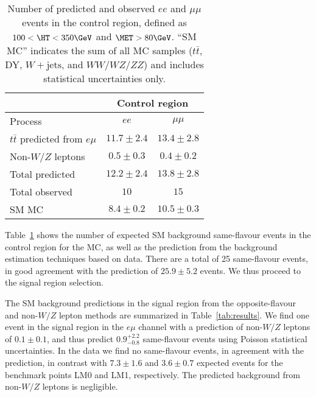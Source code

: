 \begin{table}[hbt]
\begin{center}
\caption{\label{tab:CRresults}
Number of predicted and observed $ee$ and $\mu\mu$ 
events in the control region, defined as $100 < \HT < 350\GeV$ and $\MET > 80\GeV$.
``SM MC'' indicates the sum of all MC samples ($t\bar{t}$, DY, $W+\textrm{jets}$, and $WW/WZ/ZZ$)
and includes statistical uncertainties only.
}
\vspace{2 mm}
\begin{tabular}{l|cc}
\hline
                                 & \multicolumn{2}{c}{Control region}               \\
\hline 
Process                          & $ee$          & $\mu\mu$        \\
\hline
$t\bar{t}$ predicted from $e\mu$ & $11.7\pm 2.4$ & $13.4\pm 2.8$   \\
Non-$W/Z$ leptons                & $0.5\pm 0.3$  & $0.4\pm0.2$ \\
\hline
Total predicted                  & $12.2\pm 2.4$ & $13.8 \pm 2.8$  \\
\hline\hline
Total observed                   & $10$          & $15$          \\
\hline \hline
SM MC                            & $8.4\pm 0.2$  & $10.5 \pm 0.3$    \\

\hline
\end{tabular}
\end{center}
\end{table}
 
Table~\ref{tab:CRresults} shows the number of expected SM background same-flavour events in the control region for the MC, 
as well as the prediction from the background estimation techniques based on data. There are a total of 25 same-flavour 
events, in good agreement with the prediction of $25.9 \pm 5.2$ events.
We thus proceed to the signal region selection. 

The SM background predictions in the signal region from the opposite-flavour and non-$W/Z$ lepton methods 
are summarized in Table~\ref{tab:results}. 
We find one event in the signal region in the $e\mu$ channel with a prediction of non-$W/Z$ leptons
of $0.1\pm0.1$, and thus predict $0.9 {}_{-0.8}^{+2.2}$ same-flavour events using Poisson statistical uncertainties.
In the data we find no same-flavour events, in agreement with the prediction, in contrast with $7.3\pm1.6$ 
and $3.6\pm0.7$ expected events for the benchmark points LM0 and LM1, respectively. 
The predicted background from non-$W/Z$ leptons is negligible.

